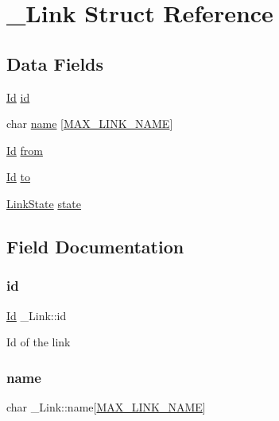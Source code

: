 \hypertarget{struct__Link}{}\section{\+\_\+\+Link Struct Reference}
\label{struct__Link}
\subsection*{Data Fields}
\begin{DoxyCompactItemize}
\item 
\hyperlink{types_8h_a845e604fb28f7e3d97549da3448149d3}{Id} \hyperlink{struct__Link_a151212e7a8e8274c2a1ee991ba95878b}{id}
\item 
char \hyperlink{struct__Link_ac7b76fdc8029565d25ad0aae70c5675b}{name} \mbox{[}\hyperlink{link_8h_ab4477e941817afbf1649fdf3dfb62d70}{M\+A\+X\+\_\+\+L\+I\+N\+K\+\_\+\+N\+A\+ME}\mbox{]}
\item 
\hyperlink{types_8h_a845e604fb28f7e3d97549da3448149d3}{Id} \hyperlink{struct__Link_ae33a61999d11b202a1e1af285aaa84b0}{from}
\item 
\hyperlink{types_8h_a845e604fb28f7e3d97549da3448149d3}{Id} \hyperlink{struct__Link_a54563ccd62fdc5057f55fa8f205d928c}{to}
\item 
\hyperlink{link_8h_ab0033b911037fd995258d117e65461e0}{Link\+State} \hyperlink{struct__Link_a58ecee77b2af4dddadb7e8ff94fa0d15}{state}
\end{DoxyCompactItemize}


\subsection{Field Documentation}
\mbox{\label{struct__Link_a151212e7a8e8274c2a1ee991ba95878b}} 
\subsubsection{\texorpdfstring{id}{id}}
{\footnotesize\ttfamily \hyperlink{types_8h_a845e604fb28f7e3d97549da3448149d3}{Id} \+\_\+\+Link\+::id}

Id of the link \mbox{\label{struct__Link_ac7b76fdc8029565d25ad0aae70c5675b}} 
\subsubsection{\texorpdfstring{name}{name}}
{\footnotesize\ttfamily char \+\_\+\+Link\+::name\mbox{[}\hyperlink{link_8h_ab4477e941817afbf1649fdf3dfb62d70}{M\+A\+X\+\_\+\+L\+I\+N\+K\+\_\+\+N\+A\+ME}\mbox{]}}

